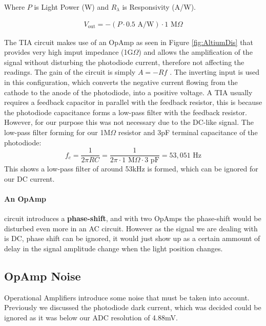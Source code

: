 Where $P$ is Light Power (W) and $R_{\lambda}$ is Responsivity (A/W).

\begin{equation} \label{eq:TIAoutputWithValues}
  \begin{split}
  V_{\text{out}} = -(P \cdot 0.5 \text{ A/W}) \cdot 1 \text{ M}\Omega
  \end{split}
\end{equation}

The \ac{TIA} circuit makes use of an \ac{OpAmp} as seen in Figure \ref{fig:AltiumDis} that provides very high imput impedance (1G$\Omega$) and allows the amplification of the signal without disturbing the photodiode current, therefore not affecting the readings. The gain of the circuit is simply $A=-Rf$ \cite[p.535]{RefWorks:horowitz2015theart}. The inverting input is used in this configuration, which converts the negative current flowing from the cathode to the anode of the photodiode, into a positive voltage. A \ac{TIA} usually requires a feedback capacitor in parallel with the feedback resistor, this is because the photodiode capacitance forms a low-pass filter with the feedback resistor. However, for our purpose this was not necessary due to the DC-like signal. The low-pass filter forming for our 1M$\Omega$ resistor and 3pF terminal capacitance of the photodiode:
\begin{equation} \label{eq:LPfilterCRf}
f_c = \frac{1}{2\pi RC} = \frac{1}{2\pi \cdot 1\text{ M}\Omega \cdot 3\text{ pF}} = 53,051\text{ Hz}
\end{equation}
This shows a low-pass filter of around 53kHz is formed, which can be ignored for our DC current.
\paragraph{An \ac{OpAmp}} circuit introduces a \textbf{phase-shift}, and with two \acp{OpAmp} the phase-shift would be disturbed even more in an AC circuit. However as the signal we are dealing with is DC, phase shift can be ignored, it would just show up as a certain ammount of delay in the signal amplitude change when the light position changes.

\subsection{OpAmp Noise}
Operational Amplifiers introduce some noise that must be taken into account. Previously we discussed the photodiode dark current, which was decided could be ignored as it was below our ADC resolution of 4.88mV.

